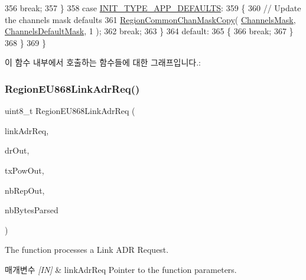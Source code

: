 \begin{DoxyCode}
356             \textcolor{keywordflow}{break};
357         \}
358         \textcolor{keywordflow}{case} \mbox{\hyperlink{group___r_e_g_i_o_n_gga11ecad794560a3d3961bdf1c9a27d3b2a3d260b94611dd833c5243c16ca26c3f0}{INIT\_TYPE\_APP\_DEFAULTS}}:
359         \{
360             \textcolor{comment}{// Update the channels mask defaults}
361             \mbox{\hyperlink{group___r_e_g_i_o_n_c_o_m_m_o_n_ga95f5199d490113269fae7f2e0569e9a0}{RegionCommonChanMaskCopy}}( \mbox{\hyperlink{_region_e_u868_8c_a2188957b5ca6af8092154d7ccbfa5757}{ChannelsMask}}, 
      \mbox{\hyperlink{_region_e_u868_8c_ac127b19779301713d5ed92eb03366a2d}{ChannelsDefaultMask}}, 1 );
362             \textcolor{keywordflow}{break};
363         \}
364         \textcolor{keywordflow}{default}:
365         \{
366             \textcolor{keywordflow}{break};
367         \}
368     \}
369 \}
\end{DoxyCode}
이 함수 내부에서 호출하는 함수들에 대한 그래프입니다.\+:
\mbox{\label{group___r_e_g_i_o_n_e_u868_gace7b25487170fb5d862413fc221f95db}} 
\subsubsection{\texorpdfstring{Region\+E\+U868\+Link\+Adr\+Req()}{RegionEU868LinkAdrReq()}}
{\footnotesize\ttfamily uint8\+\_\+t Region\+E\+U868\+Link\+Adr\+Req (\begin{DoxyParamCaption}\item[{\mbox{\hyperlink{group___r_e_g_i_o_n_gad4af503e8d4de1846129e26a799a1e8e}{Link\+Adr\+Req\+Params\+\_\+t}} $\ast$}]{link\+Adr\+Req,  }\item[{int8\+\_\+t $\ast$}]{dr\+Out,  }\item[{int8\+\_\+t $\ast$}]{tx\+Pow\+Out,  }\item[{uint8\+\_\+t $\ast$}]{nb\+Rep\+Out,  }\item[{uint8\+\_\+t $\ast$}]{nb\+Bytes\+Parsed }\end{DoxyParamCaption})}



The function processes a Link A\+DR Request. 


\begin{DoxyParams}{매개변수}
{\em \mbox{[}\+I\+N\mbox{]}} & link\+Adr\+Req Pointer to the function parameters.\\
\hline
\end{DoxyParams}

